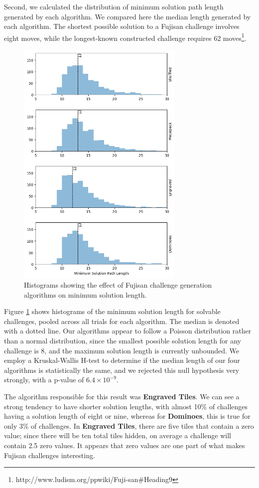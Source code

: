 \documentclass[journal]{IEEEtran}
\begin{document}
Second, we calculated the distribution of minimum solution path length generated by each algorithm. We compared here the median length generated by each algorithm. The shortest possible solution to a Fujisan challenge involves eight moves, while 
the longest-known constructed challenge requires 62 moves\footnote{http://www.ludism.org/ppwiki/Fuji-san\#Heading9}.

\begin{figure}[t]
\centering
\includegraphics[width=8cm]{figure17.png}
\caption{Histograms showing the effect of Fujisan challenge generation algorithms on minimum solution length.}
\label{fig:difficultycomp}
\end{figure}

Figure \ref{fig:difficultycomp} shows histograms of the minimum solution length for solvable challenges, pooled across all trials for each algorithm. The median is denoted with a dotted line. Our algorithms appear to follow a Poisson distribution rather than a normal distribution, since the smallest possible solution length for any challenge is 8, and the maximum solution length is currently unbounded. We employ a Kruskal-Wallis H-test \cite{KRUSKAL} to determine if the median length of our four algorithms is statistically the same, and we rejected this null hypothesis very strongly, with a p-value of $6.4 \times 10^{-9}$.

The algorithm responsible for this result was {\bf Engraved Tiles}. We can see a strong tendency to have shorter solution lengths, with almost 10\% of challenges having a solution length of eight or nine, whereas for {\bf Dominoes}, this is true for only 3\% of challenges. In {\bf Engraved Tiles}, there are five tiles that contain a zero value; since there will be ten total tiles hidden, on average a challenge will contain 2.5 zero values. It appears that zero values are one part of what makes Fujisan challenges interesting.
\end{document}
